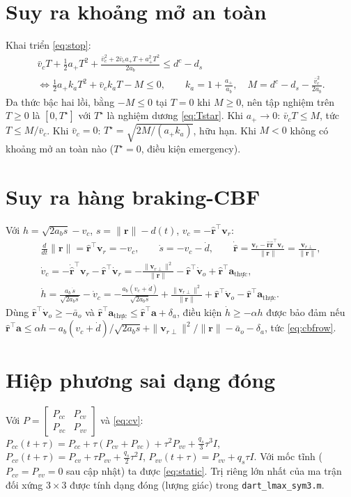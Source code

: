 \documentclass[11pt,a4paper]{article}
\numberwithin{equation}{section}
\newcommand{\vb}[1]{\bm{#1}}
\newcommand{\T}{^{\!\top}}
\newcommand{\code}[1]{\texttt{\small #1}}
\theoremstyle{definition}
\theoremstyle{plain}
\theoremstyle{remark}
\begin{document}
\appendix
\section{Suy ra khoảng mở an toàn}
\label{app:Tstar}
Khai triển \eqref{eq:stop}:
\begin{gather*}
\bar v_cT+\tfrac12a_+T^2+\frac{\bar v_c^2+2\bar v_ca_+T+a_+^2T^2}{2a_b}\le d^c-d_s\\
\iff \tfrac12a_+k_aT^2+\bar v_ck_aT-M\le0,\qquad k_a=1+\frac{a_+}{a_b},\quad M=d^c-d_s-\frac{\bar v_c^2}{2a_b}.
\end{gather*}
Đa thức bậc hai lồi, bằng $-M\le0$ tại $T=0$ khi $M\ge0$, nên tập nghiệm trên $T\ge0$ là $[0,T^\star]$ với $T^\star$ là nghiệm dương \eqref{eq:Tstar}. Khi $a_+\to0$: $\bar v_cT\le M$, tức $T\le M/\bar v_c$. Khi $\bar v_c=0$: $T^\star=\sqrt{2M/(a_+k_a)}$, hữu hạn. Khi $M<0$ không có khoảng mở an toàn nào ($T^\star=0$, điều kiện emergency).

\section{Suy ra hàng braking-CBF}
\label{app:cbf}
Với $h=\sqrt{2a_bs}-v_c$, $s=\|\vb r\|-d(t)$, $v_c=-\hat{\vb r}\T\vb v_r$:
\begin{gather*}
\frac{d}{dt}\|\vb r\|=\hat{\vb r}\T\vb v_r=-v_c,\qquad \dot s=-v_c-\dot d,\qquad
\dot{\hat{\vb r}}=\frac{\vb v_r-\hat{\vb r}\hat{\vb r}\T\vb v_r}{\|\vb r\|}=\frac{\vb v_{r\perp}}{\|\vb r\|},\\
\dot v_c=-\dot{\hat{\vb r}}\T\vb v_r-\hat{\vb r}\T\dot{\vb v}_r=-\frac{\|\vb v_{r\perp}\|^2}{\|\vb r\|}-\hat{\vb r}\T\dot{\vb v}_o+\hat{\vb r}\T\vb a_{\text{thực}},\\
\dot h=\frac{a_b\,\dot s}{\sqrt{2a_bs}}-\dot v_c=-\frac{a_b(v_c+\dot d)}{\sqrt{2a_bs}}+\frac{\|\vb v_{r\perp}\|^2}{\|\vb r\|}+\hat{\vb r}\T\dot{\vb v}_o-\hat{\vb r}\T\vb a_{\text{thực}}.
\end{gather*}
Dùng $\hat{\vb r}\T\dot{\vb v}_o\ge-\bar a_o$ và $\hat{\vb r}\T\vb a_{\text{thực}}\le\hat{\vb r}\T\vb a+\delta_a$, điều kiện $\dot h\ge-\alpha h$ được bảo đảm nếu
$\hat{\vb r}\T\vb a\le\alpha h-a_b(v_c+\dot d)/\sqrt{2a_bs}+\|\vb v_{r\perp}\|^2/\|\vb r\|-\bar a_o-\delta_a$, tức \eqref{eq:cbfrow}.

\section{Hiệp phương sai dạng đóng}
\label{app:cov}
Với $P=\begin{bmatrix}P_{cc}&P_{cv}\\P_{vc}&P_{vv}\end{bmatrix}$ và \eqref{eq:cv}:
$P_{cc}(t+\tau)=P_{cc}+\tau(P_{cv}+P_{vc})+\tau^2P_{vv}+\tfrac{q_s}{3}\tau^3I$, $P_{cv}(t+\tau)=P_{cv}+\tau P_{vv}+\tfrac{q_s}{2}\tau^2I$, $P_{vv}(t+\tau)=P_{vv}+q_s\tau I$. Với mốc tĩnh ($P_{cv}=P_{vv}=0$ sau cập nhật) ta được \eqref{eq:static}. Trị riêng lớn nhất của ma trận đối xứng $3\times3$ được tính dạng đóng (lượng giác) trong \code{dart\_lmax\_sym3.m}.
\end{document}
